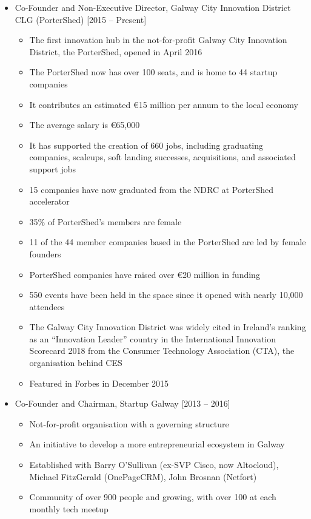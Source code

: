 \documentclass[10pt,a4paper]{res} %
\begin{document}
\begin{resume}
\begin{itemize} \itemsep -2pt
\item Co-Founder and Non-Executive Director, Galway City Innovation District CLG (PorterShed) [2015 -- Present]
\begin{itemize} \itemsep -2pt
\item The first innovation hub in the not-for-profit Galway City Innovation District, the PorterShed, opened in April 2016
\item The PorterShed now has over 100 seats, and is home to 44 startup companies
\item It contributes an estimated \euro{}15 million per annum to the local economy
\item The average salary is \euro{}65,000
\item It has supported the creation of 660 jobs, including graduating companies, scaleups, soft landing successes, acquisitions, and associated support jobs
\item 15 companies have now graduated from the NDRC at PorterShed accelerator
\item 35\% of PorterShed’s members are female
\item 11 of the 44 member companies based in the PorterShed are led by female founders
\item PorterShed companies have raised over \euro{}20 million in funding
\item 550 events have been held in the space since it opened with nearly 10,000 attendees
\item The Galway City Innovation District was widely cited in Ireland’s ranking as an ``Innovation Leader'' country in the International Innovation Scorecard 2018 from the Consumer Technology Association (CTA), the organisation behind CES
\item Featured in Forbes in December 2015
\end{itemize}
\item Co-Founder and Chairman, Startup Galway [2013 -- 2016]
\begin{itemize} \itemsep -2pt
\item Not-for-profit organisation with a governing structure
\item An initiative to develop a more entrepreneurial ecosystem in Galway
\item Established with Barry O'Sullivan (ex-SVP Cisco, now Altocloud), Michael FitzGerald (OnePageCRM), John Brosnan (Netfort)
\item Community of over 900 people and growing, with over 100 at each monthly tech meetup

\end{itemize}
\end{itemize}
\end{resume}
\end{document}
